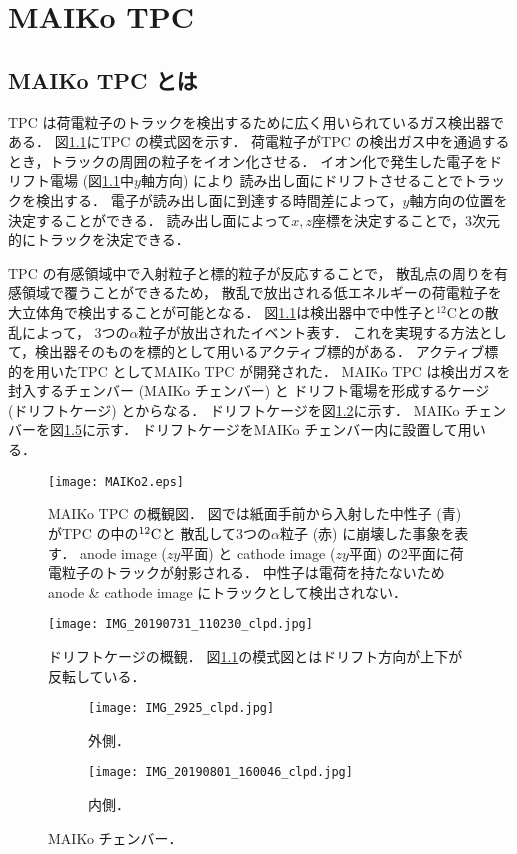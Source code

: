 \documentclass[../master]{subfiles}
\begin{document}
\chapter{MAIKo TPC}
\section{MAIKo TPC とは}
TPC は荷電粒子のトラックを検出するために広く用いられているガス検出器である．
図\ref{fig::MAIKo_view}にTPC の模式図を示す．
荷電粒子がTPC の検出ガス中を通過するとき，トラックの周囲の粒子をイオン化させる．
イオン化で発生した電子をドリフト電場 (図\ref{fig::MAIKo_view}中$y$軸方向) により
読み出し面にドリフトさせることでトラックを検出する．
電子が読み出し面に到達する時間差によって，$y$軸方向の位置を決定することができる．
読み出し面によって$x, z$座標を決定することで，3次元的にトラックを決定できる．

TPC の有感領域中で入射粒子と標的粒子が反応することで，
散乱点の周りを有感領域で覆うことができるため，
散乱で放出される低エネルギーの荷電粒子を大立体角で検出することが可能となる．
図\ref{fig::MAIKo_view}は検出器中で中性子と${}^{12}\mathrm{C}$との散乱によって，
3つの$\alpha$粒子が放出されたイベント表す．
これを実現する方法として，検出器そのものを標的として用いるアクティブ標的がある．
アクティブ標的を用いたTPC としてMAIKo TPC が開発された．
MAIKo TPC は検出ガスを封入するチェンバー (MAIKo チェンバー) と
ドリフト電場を形成するケージ (ドリフトケージ) とからなる．
ドリフトケージを図\ref{pic::MAIKo_cage}に示す．
MAIKo チェンバーを図\ref{pic::MAIKo_chamber}に示す．
ドリフトケージをMAIKo チェンバー内に設置して用いる．
\begin{figure}
  \centering
  \texttt{[image: MAIKo2.eps]}
  \caption[MAIKo TPC の概観図．]{MAIKo TPC の概観図．
    図では紙面手前から入射した中性子 (青) がTPC の中の${}^{12}{\rm C}$と
    散乱して3つの$\alpha$粒子 (赤) に崩壊した事象を表す．
    anode image ($zy$平面) と cathode image ($zy$平面) の2平面に荷電粒子のトラックが射影される．
    中性子は電荷を持たないためanode \& cathode image にトラックとして検出されない．
  }
  \label{fig::MAIKo_view}
\end{figure}
\begin{figure}
  \centering
  \texttt{[image: IMG\_20190731\_110230\_clpd.jpg]}
  \caption[ドリフトケージの概観．]
          {ドリフトケージの概観．
          図\ref{fig::MAIKo_view}の模式図とはドリフト方向が上下が反転している．}
  \label{pic::MAIKo_cage}
\end{figure}
\begin{figure}
  \centering
  \begin{subfigure}{0.45\columnwidth}
    \centering
    \texttt{[image: IMG\_2925\_clpd.jpg]}
    \caption{外側．}
    \label{pic::MAIKo_chamber_out}
  \end{subfigure}
  \begin{subfigure}{0.45\columnwidth}
    \centering
    \texttt{[image: IMG\_20190801\_160046\_clpd.jpg]}
    \caption{内側．}
    \label{pic::MAIKo_chamber_in}
  \end{subfigure}
  \caption{MAIKo チェンバー．}
  \label{pic::MAIKo_chamber}
\end{figure}
\end{document}
